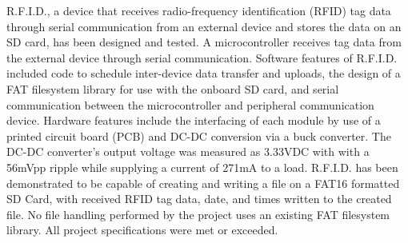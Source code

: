R.F.I.D., a device that receives radio-frequency identification (RFID) tag data through serial communication from an external device and stores the data on an SD card, has been designed and tested. A microcontroller receives tag data from the external device through serial communication. Software features of R.F.I.D. included code to schedule inter-device data transfer and uploads, the design of a FAT filesystem library for use with the onboard SD card, and serial communication between the microcontroller and peripheral communication device. Hardware features include the interfacing of each module by use of a printed circuit board (PCB) and DC-DC conversion via a buck converter. The DC-DC converter's output voltage was measured as 3.33VDC with with a 56mVpp ripple while supplying a current of 271mA to a load. R.F.I.D. has been demonstrated to be capable of creating and writing a file on a FAT16 formatted SD Card, with received RFID tag data, date, and times written to the created file. No file handling performed by the project uses an existing FAT filesystem library. All project specifications were met or exceeded.





